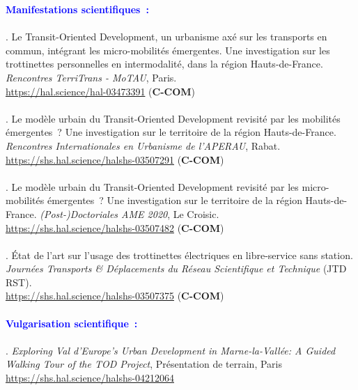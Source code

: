 \begin{refsegment}
     \newpage
     
    \begin{tcolorbox}[colback=white!5!white,
                      colframe=blue!75!blue,
                      title=Valorisation scientifique
                      \\
                      Chapitre~1]
\Large{\textcolor{blue}{\textbf{Manifestations scientifiques~:}}}
    \\\\
\small{\textcolor{blue}{\textcite{moinse_transit-oriented_2021}}. Le Transit-Oriented Development, un urbanisme axé sur les transports en commun, intégrant les micro-mobilités émergentes. Une investigation sur les trottinettes personnelles en intermodalité, dans la région Hauts-de-France. \textsl{Rencontres TerriTrans - MoTAU}, Paris.
\\
\footnotesize{\url{https://hal.science/hal-03473391}} (\textbf{C-COM})}
    \\\\
\small{\textcolor{blue}{\textcite{moinse_modeurbain_2021}}. Le modèle urbain du Transit-Oriented Development revisité par les mobilités émergentes~? Une investigation sur le territoire de la région Hauts-de-France. \textsl{Rencontres Internationales en Urbanisme de l'APERAU}, Rabat.
\\
\footnotesize{\url{https://shs.hal.science/halshs-03507291}} (\textbf{C-COM})}
    \\\\
\small{\textcolor{blue}{\textcite{moinse_modeurbain_2020}}. Le modèle urbain du Transit-Oriented Development revisité par les micro-mobilités émergentes~? Une investigation sur le territoire de la région Hauts-de-France. \textsl{(Post-)Doctoriales AME 2020}, Le Croisic.
\\
\footnotesize{\url{https://shs.hal.science/halshs-03507482}} (\textbf{C-COM})}
    \\\\
\small{\textcolor{blue}{\textcite{moinse_etat_2020}}. État de l'art sur l'usage des trottinettes électriques en libre-service sans station. \textsl{Journées Transports \& Déplacements du Réseau Scientifique et Technique} (JTD RST). 
\\
\footnotesize{\url{https://shs.hal.science/halshs-03507375}} (\textbf{C-COM})}
    \\\\
\Large{\textcolor{blue}{\textbf{Vulgarisation scientifique~:}}}
    \\\\
\normalsize{\textcolor{blue}{\textcite{moinse_exploring_2023}}. \foreignlanguage{english}{\textsl{Exploring Val d'Europe's Urban Development in Marne-la-Vallée: A Guided Walking Tour of the TOD Project}}, Présentation de terrain, Paris
\\
\footnotesize{\url{https://shs.hal.science/halshs-04212064}}}
    \end{tcolorbox}


\end{refsegment}
